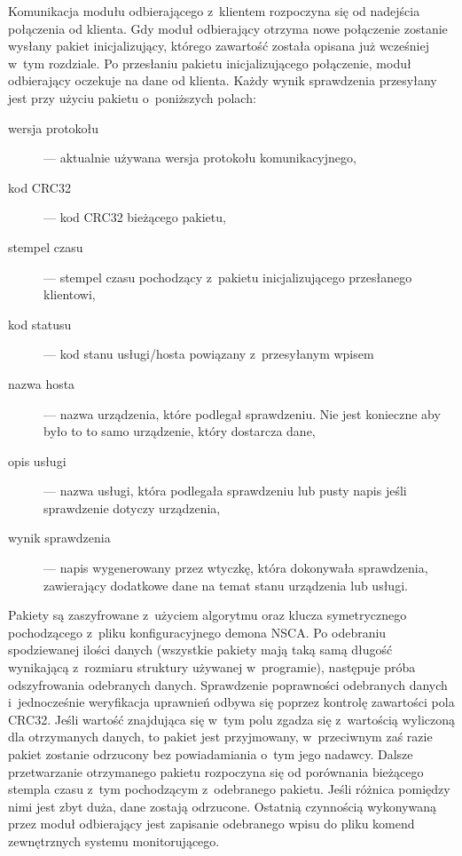 Komunikacja modułu odbierającego z~klientem rozpoczyna się od
nadejścia połączenia od klienta. Gdy moduł odbierający otrzyma nowe
połączenie zostanie wysłany pakiet inicjalizujący, którego zawartość
została opisana już wcześniej w~tym rozdziale. Po przesłaniu pakietu
inicjalizującego połączenie, moduł odbierający oczekuje na dane od
klienta. Każdy wynik sprawdzenia przesyłany jest przy użyciu pakietu
o~poniższych polach:

\begin{description}
\item[wersja protokołu] ---  aktualnie używana wersja protokołu komunikacyjnego,
\item[kod CRC32] ---  kod CRC32 bieżącego pakietu,
\item[stempel czasu] --- stempel czasu pochodzący z~pakietu
  inicjalizującego przesłanego klientowi,
\item[kod statusu] --- kod stanu usługi/hosta powiązany z~przesyłanym wpisem
\item[nazwa hosta] --- nazwa urządzenia, które podlegał sprawdzeniu. Nie jest
  konieczne aby było to to samo urządzenie, który dostarcza dane,
\item[opis usługi] --- nazwa usługi, która podlegała sprawdzeniu lub pusty
  napis jeśli sprawdzenie dotyczy urządzenia,
\item[wynik sprawdzenia] --- napis wygenerowany przez wtyczkę, która
  dokonywała sprawdzenia, zawierający dodatkowe dane na temat stanu
  urządzenia lub usługi.
\end{description}

Pakiety są zaszyfrowane z~użyciem algorytmu oraz klucza symetrycznego
pochodzącego z~pliku konfiguracyjnego demona NSCA. Po odebraniu
spodziewanej ilości danych (wszystkie pakiety mają taką samą długość
wynikającą z~rozmiaru struktury używanej w~programie), następuje próba
odszyfrowania odebranych danych. Sprawdzenie poprawności odebranych
danych i~jednocześnie weryfikacja uprawnień odbywa się poprzez
kontrolę zawartości pola CRC32. Jeśli wartość znajdująca się w~tym
polu zgadza się z~wartością wyliczoną dla otrzymanych danych, to
pakiet jest przyjmowany, w~przeciwnym zaś razie pakiet zostanie
odrzucony bez powiadamiania o~tym jego nadawcy. Dalsze przetwarzanie
otrzymanego pakietu rozpoczyna się od porównania bieżącego stempla
czasu z~tym pochodzącym z~odebranego pakietu. Jeśli różnica pomiędzy
nimi jest zbyt duża, dane zostają odrzucone. Ostatnią czynnością
wykonywaną przez moduł odbierający jest zapisanie odebranego wpisu do
pliku komend zewnętrznych systemu monitorującego.

